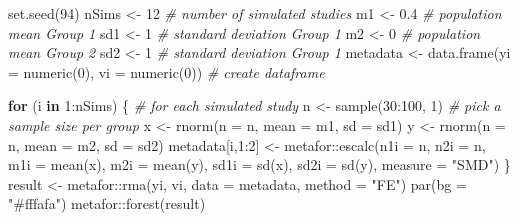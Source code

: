 \documentclass[
  oneside]{krantz}
\makeatletter
\newenvironment{Shaded}{\begin{snugshade}}{\end{snugshade}}
\newcommand{\AttributeTok}[1]{\textcolor[rgb]{0.61,0.61,0.61}{#1}}
\newcommand{\CommentTok}[1]{\textcolor[rgb]{0.37,0.37,0.37}{\textit{#1}}}
\newcommand{\ControlFlowTok}[1]{\textcolor[rgb]{0.27,0.27,0.27}{\textbf{#1}}}
\newcommand{\DecValTok}[1]{\textcolor[rgb]{0.06,0.06,0.06}{#1}}
\newcommand{\FloatTok}[1]{\textcolor[rgb]{0.06,0.06,0.06}{#1}}
\newcommand{\FunctionTok}[1]{\textcolor[rgb]{0,0,0}{#1}}
\newcommand{\NormalTok}[1]{#1}
\newcommand{\OtherTok}[1]{\textcolor[rgb]{0.37,0.37,0.37}{#1}}
\newcommand{\SpecialCharTok}[1]{\textcolor[rgb]{0,0,0}{#1}}
\newcommand{\StringTok}[1]{\textcolor[rgb]{0.5,0.5,0.5}{#1}}
\newenvironment{kframe}{%
\medskip{}
\setlength{\fboxsep}{.8em}
 \def\at@end@of@kframe{}%
 \ifinner\ifhmode%
  \def\at@end@of@kframe{\end{minipage}}%
  \begin{minipage}{\columnwidth}%
 \fi\fi%
 \def\FrameCommand##1{\hskip\@totalleftmargin \hskip-\fboxsep
 \colorbox{shadecolor}{##1}\hskip-\fboxsep
     \hskip-\linewidth \hskip-\@totalleftmargin \hskip\columnwidth}%
 \MakeFramed {\advance\hsize-\width
   \@totalleftmargin\z@ \linewidth\hsize
   \@setminipage}}%
 {\par\unskip\endMakeFramed%
 \at@end@of@kframe}
\renewenvironment{Shaded}{\begin{kframe}}{\end{kframe}}
\makeatother
\begin{document}
\begin{Shaded}
\begin{Highlighting}[]
\FunctionTok{set.seed}\NormalTok{(}\DecValTok{94}\NormalTok{)}
\NormalTok{nSims }\OtherTok{\textless{}{-}} \DecValTok{12} \CommentTok{\# number of simulated studies}
\NormalTok{m1 }\OtherTok{\textless{}{-}} \FloatTok{0.4} \CommentTok{\# population mean Group 1}
\NormalTok{sd1 }\OtherTok{\textless{}{-}} \DecValTok{1} \CommentTok{\# standard deviation Group 1}
\NormalTok{m2 }\OtherTok{\textless{}{-}} \DecValTok{0} \CommentTok{\# population mean Group 2}
\NormalTok{sd2 }\OtherTok{\textless{}{-}} \DecValTok{1} \CommentTok{\# standard deviation Group 1}
\NormalTok{metadata }\OtherTok{\textless{}{-}} \FunctionTok{data.frame}\NormalTok{(}\AttributeTok{yi =} \FunctionTok{numeric}\NormalTok{(}\DecValTok{0}\NormalTok{), }\AttributeTok{vi =} \FunctionTok{numeric}\NormalTok{(}\DecValTok{0}\NormalTok{)) }\CommentTok{\# create dataframe}

\ControlFlowTok{for}\NormalTok{ (i }\ControlFlowTok{in} \DecValTok{1}\SpecialCharTok{:}\NormalTok{nSims) \{ }\CommentTok{\# for each simulated study}
\NormalTok{  n }\OtherTok{\textless{}{-}} \FunctionTok{sample}\NormalTok{(}\DecValTok{30}\SpecialCharTok{:}\DecValTok{100}\NormalTok{, }\DecValTok{1}\NormalTok{) }\CommentTok{\# pick a sample size per group}
\NormalTok{  x }\OtherTok{\textless{}{-}} \FunctionTok{rnorm}\NormalTok{(}\AttributeTok{n =}\NormalTok{ n, }\AttributeTok{mean =}\NormalTok{ m1, }\AttributeTok{sd =}\NormalTok{ sd1) }
\NormalTok{  y }\OtherTok{\textless{}{-}} \FunctionTok{rnorm}\NormalTok{(}\AttributeTok{n =}\NormalTok{ n, }\AttributeTok{mean =}\NormalTok{ m2, }\AttributeTok{sd =}\NormalTok{ sd2)}
\NormalTok{  metadata[i,}\DecValTok{1}\SpecialCharTok{:}\DecValTok{2}\NormalTok{] }\OtherTok{\textless{}{-}}\NormalTok{ metafor}\SpecialCharTok{::}\FunctionTok{escalc}\NormalTok{(}\AttributeTok{n1i =}\NormalTok{ n, }\AttributeTok{n2i =}\NormalTok{ n, }\AttributeTok{m1i =} \FunctionTok{mean}\NormalTok{(x), }
       \AttributeTok{m2i =} \FunctionTok{mean}\NormalTok{(y), }\AttributeTok{sd1i =} \FunctionTok{sd}\NormalTok{(x), }\AttributeTok{sd2i =} \FunctionTok{sd}\NormalTok{(y), }\AttributeTok{measure =} \StringTok{"SMD"}\NormalTok{)}
\NormalTok{\}}
\NormalTok{result }\OtherTok{\textless{}{-}}\NormalTok{ metafor}\SpecialCharTok{::}\FunctionTok{rma}\NormalTok{(yi, vi, }\AttributeTok{data =}\NormalTok{ metadata, }\AttributeTok{method =} \StringTok{"FE"}\NormalTok{)}
\FunctionTok{par}\NormalTok{(}\AttributeTok{bg =} \StringTok{"\#fffafa"}\NormalTok{)}
\NormalTok{metafor}\SpecialCharTok{::}\FunctionTok{forest}\NormalTok{(result)}
\end{Highlighting}
\end{Shaded}
\end{document}
